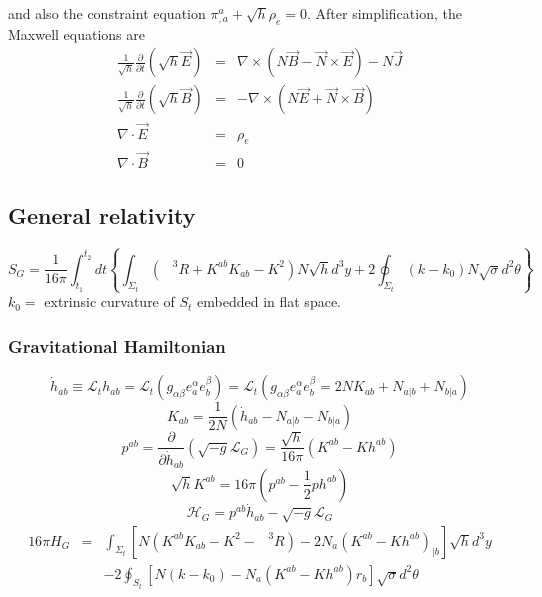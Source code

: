 \begin{example}
and also the constraint equation $\pi^a_{,a} + \sqrt{h}\rho_e = 0$.
After simplification, the Maxwell equations are
\begin{eqnarray}
\frac{1}{\sqrt{h}}\frac{\partial}{\partial t}(\sqrt{h} \vec{E}) &=& \nabla \times (N \vec{B} - \vec{N} \times \vec{E}) - N \vec{J} \nonumber \\
\frac{1}{\sqrt{h}}\frac{\partial}{\partial t}(\sqrt{h} \vec{B}) &=& -\nabla \times (N \vec{E} + \vec{N} \times \vec{B}) \nonumber \\
\nabla \cdot \vec{E} &=& \rho_e \nonumber \\
\nabla \cdot \vec{B} &=& 0 \nonumber
\end{eqnarray}
\end{example}


\subsection{General relativity}
\[S_G = \frac{1}{16 \pi} \int_{t_1}^{t_2} dt \left\{ \int_{\Sigma_t} \left(\phantom{R}^3R + K^{ab}K_{ab} -K^2 \right) N \sqrt{h} d^3 y + 2\oint_{\Sigma_t}(k-k_0)N \sqrt{\sigma}d^2 \theta \right\} \]
$k_0 =$ extrinsic curvature of $S_t$ embedded in flat space. 

\subsubsection{Gravitational Hamiltonian}
\[\dot{h}_{ab} \equiv \mathcal{L}_t h_{ab} = \mathcal{L}_t (g_{\alpha \beta} e_a^{\alpha} e_b^{\beta}) =   \mathcal{L}_t (g_{\alpha \beta}e_a^{\alpha} e_b^{\beta} = 2NK_{ab} + N_{a|b} + N_{b|a})\]
\[K_{ab} = \frac{1}{2N} (\dot{h}_{ab} - N_{a|b} - N_{b|a})\]
\[p^{ab} = \frac{\partial}{\partial \dot{h}_{ab}} (\sqrt{-g} \mathcal{L}_G) = \frac{\sqrt{h}}{16\pi} (K^{ab} - K h^{ab})\]
\[\sqrt{h}K^{ab} = 16\pi (p^{ab} - \frac{1}{2}ph^{ab})\]
\[\mathcal{H}_G = p^{ab}\dot{h}_{ab} - \sqrt{-g} \mathcal{L}_G\]
\begin{eqnarray}
16\pi H_G &=& \int_{\Sigma_t} \left[ N(K^{ab}K_{ab} - K^2 - \phantom{R}^3R) - 2N_a(K^{ab} - Kh^{ab})_{|b} \right] \sqrt{h} d^3 y 
\nonumber \\
&\phantom{=}& -2\oint_{S_t} \left[ N(k-k_0) - N_a(K^{ab}-Kh^{ab})r_b \right] \sqrt{\sigma} d^2 \theta \nonumber
\end{eqnarray}

